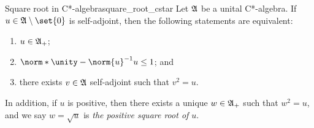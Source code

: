 \begin{theorem}{Square root in C*-algebra}{square_root_cstar}
    Let \(\mathfrak{A}\) be a unital C*-algebra. If \(u \in \algebra{A}\setminus\set{0}\) is self-adjoint, then the following statements are equivalent:
    \begin{enumerate}[label=(\alph*)]
        \item \(u \in \mathfrak{A}_+\);
        \item \(\norm*{\unity - \norm{u}^{-1}u} \leq 1\); and
        \item there exists \(v \in \mathfrak{A}\) self-adjoint such that \(v^2 = u\).
    \end{enumerate}
    In addition, if \(u\) is positive, then there exists a unique \(w \in \mathfrak{A}_+\) such that \(w^2 = u\), and we say \(w = \sqrt{u}\) is \emph{the positive square root of \(u\)}.
\end{theorem}

